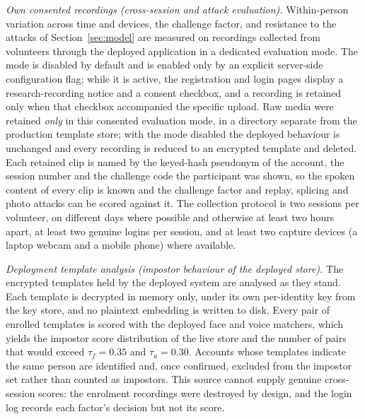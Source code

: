 \documentclass[10pt,journal,compsoc]{IEEEtran}
\begin{document}
{\emph{Own consented recordings (cross-session and attack evaluation).} Within-person variation across time and devices, the challenge factor, and resistance to the attacks of Section~\ref{sec:model} are measured on recordings collected from volunteers through the deployed application in a dedicated evaluation mode. The mode is disabled by default and is enabled only by an explicit server-side configuration flag; while it is active, the registration and login pages display a research-recording notice and a consent checkbox, and a recording is retained only when that checkbox accompanied the specific upload. Raw media were retained \emph{only} in this consented evaluation mode, in a directory separate from the production template store; with the mode disabled the deployed behaviour is unchanged and every recording is reduced to an encrypted template and deleted. Each retained clip is named by the keyed-hash pseudonym of the account, the session number and the challenge code the participant was shown, so the spoken content of every clip is known and the challenge factor and replay, splicing and photo attacks can be scored against it. The collection protocol is two sessions per volunteer, on different days where possible and otherwise at least two hours apart, at least two genuine logins per session, and at least two capture devices (a laptop webcam and a mobile phone) where available.

\emph{Deployment template analysis (impostor behaviour of the deployed store).} The encrypted templates held by the deployed system are analysed as they stand. Each template is decrypted in memory only, under its own per-identity key from the key store, and no plaintext embedding is written to disk. Every pair of enrolled templates is scored with the deployed face and voice matchers, which yields the impostor score distribution of the live store and the number of pairs that would exceed $\tau_f=0.35$ and $\tau_a=0.30$. Accounts whose templates indicate the same person are identified and, once confirmed, excluded from the impostor set rather than counted as impostors. This source cannot supply genuine cross-session scores: the enrolment recordings were destroyed by design, and the login log records each factor's decision but not its score.

}
\end{document}
